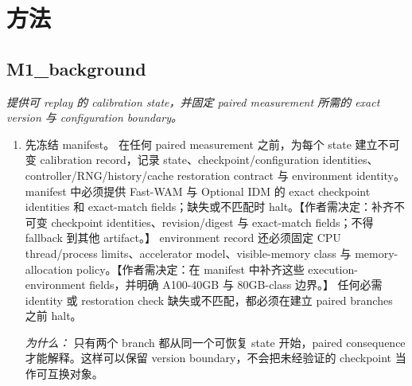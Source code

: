 \documentclass[10pt,a4paper]{article}
\begin{document}
\section*{方法}
\subsection*{M1\_background}
\emph{提供可 replay 的 calibration state，并固定 paired measurement 所需的 exact version 与 configuration boundary。}
\begin{enumerate}[leftmargin=*,start=1]
  \item 先冻结 manifest。 在任何 paired measurement 之前，为每个 state 建立不可变 calibration record，记录 state、checkpoint/configuration identities、controller/RNG/history/cache restoration contract 与 environment identity。 manifest 中必须提供 Fast-WAM 与 Optional IDM 的 exact checkpoint identities 和 exact-match fields；缺失或不匹配时 halt。【作者需决定：补齐不可变 checkpoint identities、revision/digest 与 exact-match fields；不得 fallback 到其他 artifact。】 environment record 还必须固定 CPU thread/process limits、accelerator model、visible-memory class 与 memory-allocation policy。【作者需决定：在 manifest 中补齐这些 execution-environment fields，并明确 A100-40GB 与 80GB-class 边界。】 任何必需 identity 或 restoration check 缺失或不匹配，都必须在建立 paired branches 之前 halt。
\par\emph{为什么：} 只有两个 branch 都从同一个可恢复 state 开始，paired consequence 才能解释。这样可以保留 version boundary，不会把未经验证的 checkpoint 当作可互换对象。
\end{enumerate}
\end{document}
